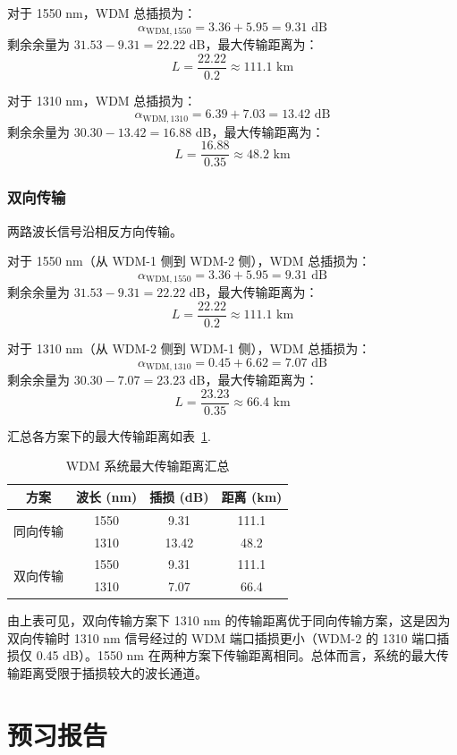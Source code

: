 \documentclass[utf8,twocolumn]{ctexart}
\begin{document}
对于 1550 nm，WDM 总插损为：
\begin{equation}
    \alpha_{\text{WDM},1550} = 3.36 + 5.95 = 9.31 \text{ dB}
\end{equation}
剩余余量为 $31.53 - 9.31 = 22.22$ dB，最大传输距离为：
\begin{equation}
    L = \frac{22.22}{0.2} \approx 111.1 \text{ km}
\end{equation}

对于 1310 nm，WDM 总插损为：
\begin{equation}
    \alpha_{\text{WDM},1310} = 6.39 + 7.03 = 13.42 \text{ dB}
\end{equation}
剩余余量为 $30.30 - 13.42 = 16.88$ dB，最大传输距离为：
\begin{equation}
    L = \frac{16.88}{0.35} \approx 48.2 \text{ km}
\end{equation}

\subsubsection{双向传输}
两路波长信号沿相反方向传输。

对于 1550 nm（从 WDM-1 侧到 WDM-2 侧），WDM 总插损为：
\begin{equation}
    \alpha_{\text{WDM},1550} = 3.36 + 5.95 = 9.31 \text{ dB}
\end{equation}
剩余余量为 $31.53 - 9.31 = 22.22$ dB，最大传输距离为：
\begin{equation}
    L = \frac{22.22}{0.2} \approx 111.1 \text{ km}
\end{equation}

对于 1310 nm（从 WDM-2 侧到 WDM-1 侧），WDM 总插损为：
\begin{equation}
    \alpha_{\text{WDM},1310} = 0.45 + 6.62 = 7.07 \text{ dB}
\end{equation}
剩余余量为 $30.30 - 7.07 = 23.23$ dB，最大传输距离为：
\begin{equation}
    L = \frac{23.23}{0.35} \approx 66.4 \text{ km}
\end{equation}

汇总各方案下的最大传输距离如表~\ref{tab:summary}.

\begin{table}[H]
    \centering
    \caption{WDM 系统最大传输距离汇总}
    \label{tab:summary}
    \begin{tabular}{cccc}
        \toprule
        方案 & 波长 (nm) & 插损 (dB) & 距离 (km) \\
        \midrule
        \multirow{2}{*}{同向传输} & 1550 & 9.31 & 111.1 \\
         & 1310 & 13.42 & 48.2 \\
        \midrule
        \multirow{2}{*}{双向传输} & 1550 & 9.31 & 111.1 \\
         & 1310 & 7.07 & 66.4 \\
        \bottomrule
    \end{tabular}
\end{table}

由上表可见，双向传输方案下 1310 nm 的传输距离优于同向传输方案，这是因为双向传输时 1310 nm 信号经过的 WDM 端口插损更小（WDM-2 的 1310 端口插损仅 0.45 dB）。1550 nm 在两种方案下传输距离相同。总体而言，系统的最大传输距离受限于插损较大的波长通道。

\onecolumn
\section{预习报告}

\end{document}
